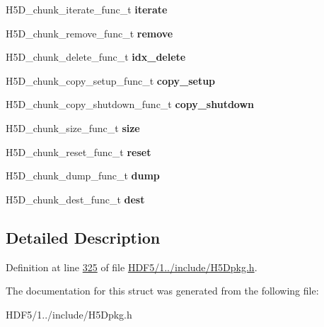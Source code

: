 \begin{DoxyCompactItemize}
H5\+D\+\_\+chunk\+\_\+iterate\+\_\+func\+\_\+t {\bfseries iterate}
\item 
\mbox{\label{struct_h5_d__chunk__ops__t_a82e2eab0bc96894b35d651fd3dfbb233}} 
H5\+D\+\_\+chunk\+\_\+remove\+\_\+func\+\_\+t {\bfseries remove}
\item 
\mbox{\label{struct_h5_d__chunk__ops__t_a7af0e7d68b339223194b20a2cd2a2b1a}} 
H5\+D\+\_\+chunk\+\_\+delete\+\_\+func\+\_\+t {\bfseries idx\+\_\+delete}
\item 
\mbox{\label{struct_h5_d__chunk__ops__t_af2f55f9326e85832da1ec6cd78b47234}} 
H5\+D\+\_\+chunk\+\_\+copy\+\_\+setup\+\_\+func\+\_\+t {\bfseries copy\+\_\+setup}
\item 
\mbox{\label{struct_h5_d__chunk__ops__t_a25ba5bf169642b00dd661ddf1225474b}} 
H5\+D\+\_\+chunk\+\_\+copy\+\_\+shutdown\+\_\+func\+\_\+t {\bfseries copy\+\_\+shutdown}
\item 
\mbox{\label{struct_h5_d__chunk__ops__t_a1beeb82762a4ba6ac169e6a86e397c21}} 
H5\+D\+\_\+chunk\+\_\+size\+\_\+func\+\_\+t {\bfseries size}
\item 
\mbox{\label{struct_h5_d__chunk__ops__t_a7aa500acbe334015db736b5f25d39e5c}} 
H5\+D\+\_\+chunk\+\_\+reset\+\_\+func\+\_\+t {\bfseries reset}
\item 
\mbox{\label{struct_h5_d__chunk__ops__t_aa48454274490825d29668e5201b88149}} 
H5\+D\+\_\+chunk\+\_\+dump\+\_\+func\+\_\+t {\bfseries dump}
\item 
\mbox{\label{struct_h5_d__chunk__ops__t_a588c74358485e2ad2361e83ce6a3d455}} 
H5\+D\+\_\+chunk\+\_\+dest\+\_\+func\+\_\+t {\bfseries dest}
\end{DoxyCompactItemize}


\subsection{Detailed Description}


Definition at line \hyperlink{_h_d_f5_21_810_81_2include_2_h5_dpkg_8h_source_l00325}{325} of file \hyperlink{_h_d_f5_21_810_81_2include_2_h5_dpkg_8h_source}{H\+D\+F5/1../include/\+H5\+Dpkg.\+h}.



The documentation for this struct was generated from the following file\+:\begin{DoxyCompactItemize}
\item 
H\+D\+F5/1../include/\+H5\+Dpkg.\+h\end{DoxyCompactItemize}
